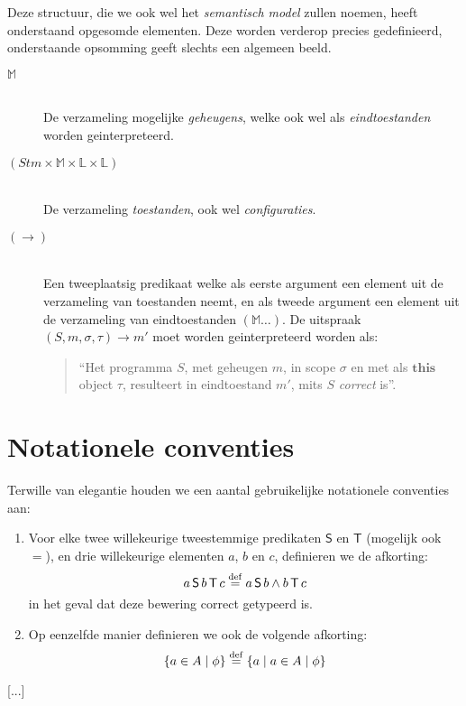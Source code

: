 Deze structuur, die we ook wel het \emph{semantisch model} zullen noemen, heeft onderstaand opgesomde elementen. Deze worden verderop precies gedefinieerd, onderstaande opsomming geeft slechts een algemeen beeld.

\begin{description}
	\item[$\mathbb{M}$]\hfill\\ De verzameling mogelijke \emph{geheugens}, welke ook wel als \emph{eindtoestanden} worden geinterpreteerd.
	\item[$(\mathit{Stm} \times \mathbb{M} \times \mathbb{L} \times \mathbb{L})$]\hfill\\ De verzameling \emph{toestanden}, ook wel \emph{configuraties}.
	\item[$(\longrightarrow)$]\hfill\\ Een tweeplaatsig predikaat welke als eerste argument een element uit de verzameling van toestanden neemt, en als tweede argument een element uit de verzameling van eindtoestanden $(\mathbb{M}\dots)$. De uitspraak $(S, m, \sigma, \tau) \longrightarrow m'$ moet worden geinterpreteerd worden als:
	\begin{quote} ``Het programma $S$, met geheugen $m$, in scope $\sigma$ en met als $\mathbf{this}$ object $\tau$, resulteert in eindtoestand $m'$, mits $S$ \emph{correct} is''. \end{quote}
\end{description}

\section{Notationele conventies}

Terwille van elegantie houden we een aantal gebruikelijke notationele conventies aan:

\begin{enumerate}
	\item Voor elke twee willekeurige tweestemmige predikaten $\mathsf{S}$ en $\mathsf{T}$ (mogelijk ook $=$), en drie willekeurige elementen $a$, $b$ en $c$, definieren we de afkorting: $$a \operatorname{\mathsf{S}} b \operatorname{\mathsf{T}} c \buildrel{\mathrm{def}}\over{=} a \operatorname{\mathsf{S}} b \land b \operatorname{\mathsf{T}} c$$ in het geval dat deze bewering correct getypeerd is.
	\item Op eenzelfde manier definieren we ook de volgende afkorting: $$ \{a \in A \mid \phi \} \buildrel{\mathrm{def}}\over{=} \{a \mid a \in A \mid \phi\}$$
\end{enumerate}

[...]
